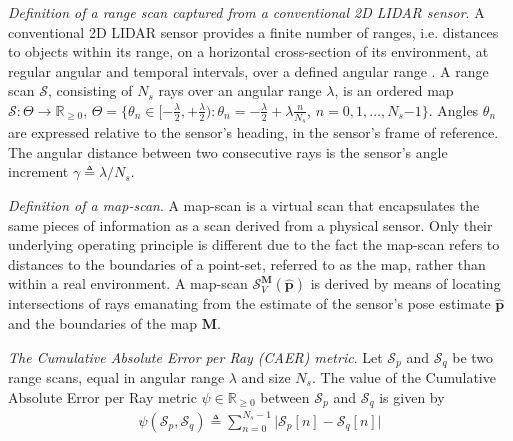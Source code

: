 \begin{definition}
  \label{def:definition_1}
  \textit{Definition of a range scan captured from a conventional 2D LIDAR
  sensor}. A conventional 2D LIDAR sensor provides a finite number of ranges,
  i.e. distances to objects within its range, on a horizontal cross-section of
  its environment, at regular angular and temporal intervals, over a defined
  angular range \cite{Cooper2018b}. A range scan $\mathcal{S}$, consisting
  of $N_s$ rays over an angular range $\lambda$, is an ordered map
  $\mathcal{S} : \Theta \rightarrow \mathbb{R}_{\geq 0}$, $\Theta =
  \{\theta_n \in [-\frac{\lambda}{2}, +\frac{\lambda}{2}) : \theta_n =
  -\frac{\lambda}{2} + \lambda \frac{n}{N_s}$, $n = 0,1,\dots, N_s$$-$$1$$\}$.
  Angles $\theta_n$ are expressed relative to the sensor's heading, in the
  sensor's frame of reference. The angular distance between two consecutive
  rays is the sensor's angle increment $\gamma \triangleq \lambda/N_s$.
\end{definition}

\begin{definition}
  \label{def:definition_2}
  \textit{Definition of a map-scan}.
  A map-scan is a virtual scan that encapsulates the same pieces of information
  as a scan derived from a physical sensor. Only their underlying operating
  principle is different due to the fact the map-scan refers to distances to
  the boundaries of a point-set, referred to as the map, rather than within a
  real environment. A map-scan $\mathcal{S}_V^{\bm{M}}(\hat{\bm{p}})$ is
  derived by means of locating intersections of rays emanating from the
  estimate of the sensor's pose estimate $\hat{\bm{p}}$ and the boundaries of
  the map $\bm{M}$.
\end{definition}

\begin{definition}
  \label{def:definition_3}
  \textit{The Cumulative Absolute Error per Ray (CAER) metric}.
  Let $\mathcal{S}_p$ and $\mathcal{S}_q$ be two range scans, equal in angular
  range $\lambda$ and size $N_s$. The value of the Cumulative Absolute Error
  per Ray metric $\psi \in \mathbb{R}_{\geq 0}$ between $\mathcal{S}_p$ and
  $\mathcal{S}_q$ is given by
  \begin{align}
    \psi(\mathcal{S}_p,\mathcal{S}_q) \triangleq \sum\limits_{n=0}^{N_s-1} \Big| \mathcal{S}_p[n]-\mathcal{S}_q[n]\Big| \nonumber
  \end{align}
\end{definition}

